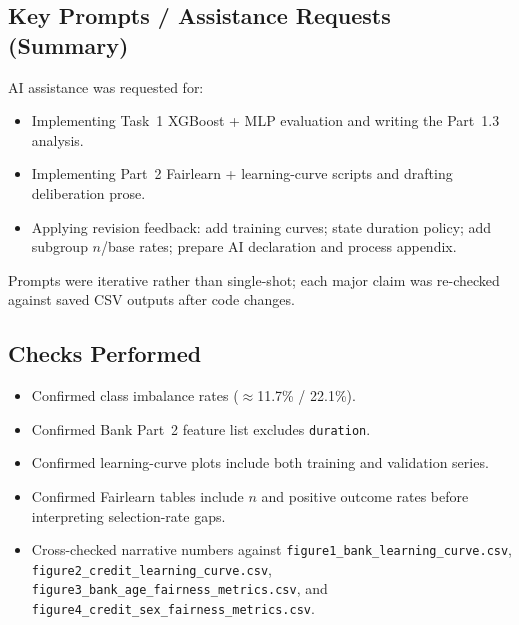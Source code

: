 \subsection{Key Prompts / Assistance Requests (Summary)}
AI assistance was requested for:
\begin{itemize}
    \item Implementing Task~1 XGBoost + MLP evaluation and writing the Part~1.3 analysis.
    \item Implementing Part~2 Fairlearn + learning-curve scripts and drafting deliberation
    prose.
    \item Applying revision feedback: add training curves; state duration policy; add
    subgroup $n$/base rates; prepare AI declaration and process appendix.
\end{itemize}
Prompts were iterative rather than single-shot; each major claim was re-checked against
saved CSV outputs after code changes.

\subsection{Checks Performed}
\begin{itemize}
    \item Confirmed class imbalance rates ($\approx$11.7\% / 22.1\%).
    \item Confirmed Bank Part~2 feature list excludes \texttt{duration}.
    \item Confirmed learning-curve plots include both training and validation series.
    \item Confirmed Fairlearn tables include $n$ and positive outcome rates before
    interpreting selection-rate gaps.
    \item Cross-checked narrative numbers against
    \texttt{figure1\_bank\_learning\_curve.csv},
    \texttt{figure2\_credit\_learning\_curve.csv},
    \texttt{figure3\_bank\_age\_fairness\_metrics.csv}, and
    \texttt{figure4\_credit\_sex\_fairness\_metrics.csv}.
\end{itemize}

